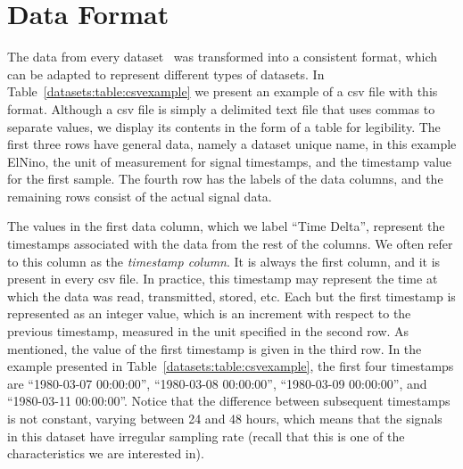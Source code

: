 
\clearpage
\section{Data Format}
\label{datasets:over}


The data from every dataset \dataCite\ was transformed into a consistent format, which can be adapted to represent different types of datasets. In Table~\ref{datasets:table:csvexample} we present an example of a csv file with this format. Although a csv file is simply a delimited text file that uses commas to separate values, we display its contents in the form of a table for legibility. The first three rows have general data, namely a dataset unique name, in this example ElNino, the unit of measurement for signal timestamps, and the timestamp value for the first sample. The fourth row has the labels of the data columns, and the remaining rows consist of the actual signal data.





\vspace{-5pt}
The values in the first data column, which we label ``Time Delta'', represent the timestamps associated with the data from the rest of the columns. We often refer to this column as the \textit{timestamp column}. It is always the first column, and it is present in every csv file. In practice, this timestamp may represent the time at which the data was read, transmitted, stored, etc. Each but the first timestamp is represented as an integer value, which is an increment with respect to the previous timestamp, measured in the unit specified in the second row. As mentioned, the value of the first timestamp is given in the third row. In the example presented in Table~\ref{datasets:table:csvexample}, the first four timestamps are ``1980-03-07 00:00:00'', ``1980-03-08 00:00:00'', ``1980-03-09 00:00:00'', and ``1980-03-11 00:00:00''. Notice that the difference between subsequent timestamps is not constant, varying between 24 and 48 hours, which means that the signals in this dataset have irregular sampling rate (recall that this is one of the characteristics we are interested in).


